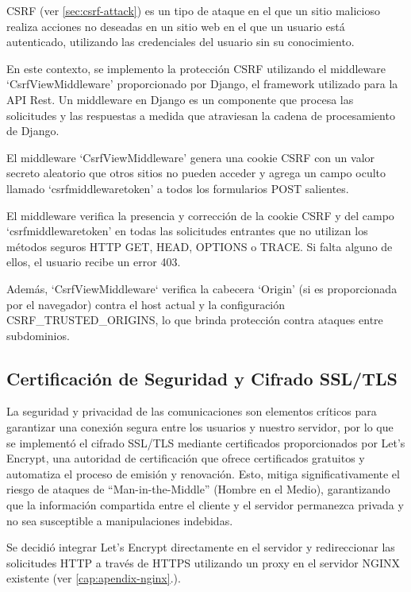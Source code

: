 CSRF (ver \ref{sec:csrf-attack}) es un tipo de ataque en el que un sitio malicioso realiza acciones no deseadas en un sitio web en el que un usuario está autenticado, utilizando las credenciales del usuario sin su conocimiento.

En este contexto, se implemento la protección CSRF utilizando el middleware `CsrfViewMiddleware' proporcionado por Django, el framework utilizado para la API Rest. Un middleware en Django es un componente que procesa las solicitudes y las respuestas a medida que atraviesan la cadena de procesamiento de Django.

El middleware `CsrfViewMiddleware' genera una cookie CSRF con un valor secreto aleatorio que otros sitios no pueden acceder y agrega un campo oculto llamado `csrfmiddlewaretoken' a todos los formularios POST salientes.

El middleware verifica la presencia y corrección de la cookie CSRF y del campo `csrfmiddlewaretoken' en todas las solicitudes entrantes que no utilizan los métodos seguros HTTP GET, HEAD, OPTIONS o TRACE. Si falta alguno de ellos, el usuario recibe un error 403.

Además, `CsrfViewMiddleware` verifica la cabecera `Origin' (si es proporcionada por el navegador) contra el host actual y la configuración CSRF\_TRUSTED\_ORIGINS, lo que brinda protección contra ataques entre subdominios.





\subsection{Certificación de Seguridad y Cifrado SSL/TLS}

La seguridad y privacidad de las comunicaciones son elementos críticos para garantizar una conexión segura entre los usuarios y nuestro servidor, por lo que se implementó el cifrado SSL/TLS mediante certificados proporcionados por Let's Encrypt, una autoridad de certificación que ofrece certificados gratuitos y automatiza el proceso de emisión y renovación.
Esto, mitiga significativamente el riesgo de ataques de ``Man-in-the-Middle'' (Hombre en el Medio), garantizando que la información compartida entre el cliente y el servidor permanezca privada y no sea susceptible a manipulaciones indebidas.

Se decidió integrar Let's Encrypt directamente en el servidor y redireccionar las solicitudes HTTP a través de HTTPS utilizando un proxy en el servidor NGINX existente (ver \ref{cap:apendix-nginx}.).

